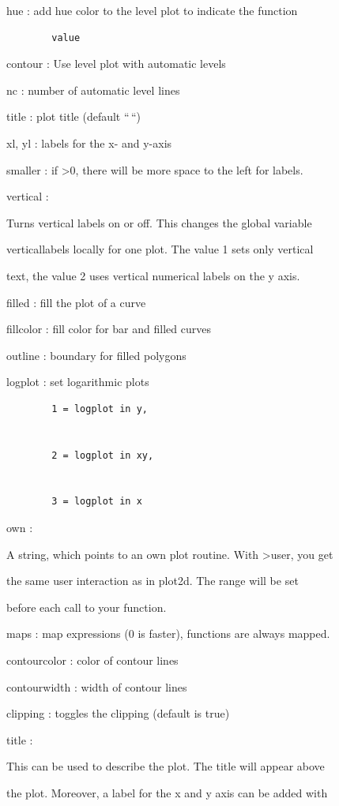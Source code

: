 \documentclass[
]{book}
\begin{document}
hue : add hue color to the level plot to indicate the function

\begin{verbatim}
        value
\end{verbatim}

contour : Use level plot with automatic levels

nc : number of automatic level lines

title : plot title (default ``\,``)

xl, yl : labels for the x- and y-axis

smaller : if \textgreater0, there will be more space to the left for labels.

vertical :

Turns vertical labels on or off. This changes the global variable

verticallabels locally for one plot. The value 1 sets only vertical

text, the value 2 uses vertical numerical labels on the y axis.

filled : fill the plot of a curve

fillcolor : fill color for bar and filled curves

outline : boundary for filled polygons

logplot : set logarithmic plots

\begin{verbatim}
        1 = logplot in y,


        2 = logplot in xy,


        3 = logplot in x
\end{verbatim}

own :

A string, which points to an own plot routine. With \textgreater user, you get

the same user interaction as in plot2d. The range will be set

before each call to your function.

maps : map expressions (0 is faster), functions are always mapped.

contourcolor : color of contour lines

contourwidth : width of contour lines

clipping : toggles the clipping (default is true)

title :

This can be used to describe the plot. The title will appear above

the plot. Moreover, a label for the x and y axis can be added with
\end{document}
